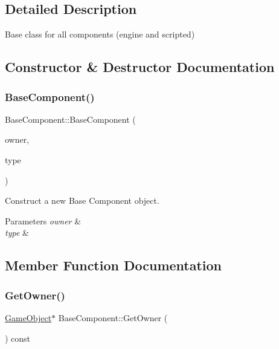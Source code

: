 \subsection{Detailed Description}
Base class for all components (engine and scripted) 

\subsection{Constructor \& Destructor Documentation}
\mbox{\label{classBaseComponent_a64d22c1f5eb72a53ed7584e24f55fcfe}} 
\subsubsection{\texorpdfstring{Base\+Component()}{BaseComponent()}}
{\footnotesize\ttfamily Base\+Component\+::\+Base\+Component (\begin{DoxyParamCaption}\item[{\hyperlink{classGameObject}{Game\+Object} $\ast$}]{owner,  }\item[{Component\+Id}]{type }\end{DoxyParamCaption})\hspace{0.3cm}{\ttfamily [inline]}}



Construct a new Base Component object. 


\begin{DoxyParams}{Parameters}
{\em owner} & \\
\hline
{\em type} & \\
\hline
\end{DoxyParams}


\subsection{Member Function Documentation}
\mbox{\label{classBaseComponent_aa07f9b9c2ebdd2c314404771857e9e07}} 
\subsubsection{\texorpdfstring{Get\+Owner()}{GetOwner()}}
{\footnotesize\ttfamily \hyperlink{classGameObject}{Game\+Object}$\ast$ Base\+Component\+::\+Get\+Owner (\begin{DoxyParamCaption}{ }\end{DoxyParamCaption}) const\hspace{0.3cm}{\ttfamily [inline]}}



